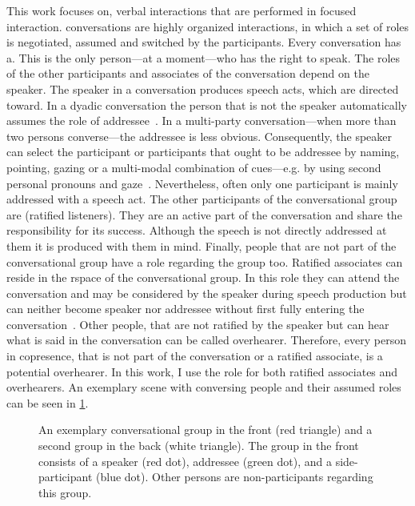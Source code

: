 This work focuses on, verbal interactions that are performed in \gls{focused interaction}.
\Glspl{conversation} are highly organized interactions, in which a set of roles is negotiated, assumed and switched by the participants.
Every \gls{conversation} has a.
This is the only person---at a moment---who has the right to speak.
The roles of the other participants and associates of the \gls{conversation} depend on the \gls{speaker}.
The \gls{speaker} in a \gls{conversation} produces speech acts, which are directed toward.
In a dyadic \gls{conversation} the person that is not the \gls{speaker} automatically assumes the role of \gls{addressee}~\cite[]{Sacks1978}.
In a multi-party \gls{conversation}---when more than two persons converse---the \gls{addressee} is less obvious.
Consequently, the \gls{speaker} can select the participant or participants that ought to be \gls{addressee} by naming, pointing, gazing or a multi-modal combination of cues---e.g. by using second personal pronouns and gaze~\cite[]{Auer2017}. 
Nevertheless, often only one participant is mainly addressed with a speech act.
The other participants of the \gls{conversational group} are (ratified listeners).
They are an active part of the \gls{conversation} and share the responsibility for its success.
Although the speech is not directly addressed at them it is produced with them in mind.
Finally, people that are not part of the \gls{conversational group} have a role regarding the group too.
Ratified associates can reside in the \gls{rspace} of the \gls{conversational group}.
In this role they can attend the \gls{conversation} and may be considered by the \gls{speaker} during speech production but can neither become \gls{speaker} nor \gls{addressee} without first fully entering the \gls{conversation}~\cite[]{Traum2003}.
Other people, that are not ratified by the \gls{speaker} but can hear what is said in the \gls{conversation} can be called overhearer.
Therefore, every person in \gls{copresence}, that is not part of the \gls{conversation} or a ratified associate, is a potential overhearer.
In this work, I use the role for both ratified associates and overhearers.
An exemplary scene with conversing people and their assumed roles can be seen in \cref{fig:rw.roles}.
\begin{figure}[htb]
    \centering
    \def\svgwidth{1.0\textwidth}
    
    \caption[Exemplary conversational group with roles.]{\label{fig:rw.roles} 
    An exemplary \gls{conversational group} in the front (red triangle) and a second group in the back (white triangle).
    The group in the front consists of a \gls{speaker} (red dot), \gls{addressee} (green dot), and a \gls{side-participant} (blue dot).
    Other  persons are \glspl{non-participant} regarding this group.
    }
\end{figure}


